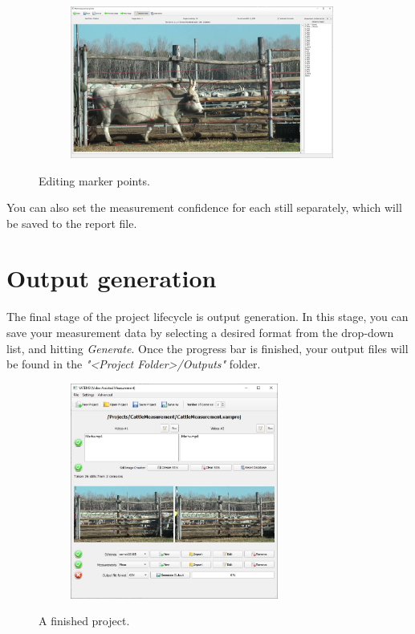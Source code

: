 \documentclass[10pt,a4paper,oneside]{report}             %
\begin{document}
\begin{figure}[H]
	\centering
	\begin{subfigure}{\textwidth}
		\centering 
		\includegraphics[width=0.95\textwidth]{./images/MeasWSel.jpg}
	\end{subfigure}
	\caption[]
	{\small  Editing marker points.}
\end{figure} 

You can also set the measurement confidence for each still separately, which will be saved to the report file.

\section{Output generation}

The final stage of the project lifecycle is output generation. In this stage, you can save your measurement data by selecting a desired format from the drop-down list, and hitting \textit{Generate}. Once the progress bar is finished, your output files will be found in the \textit{"<Project Folder>/Outputs"} folder.


\begin{figure}[H]
	\centering
	\begin{subfigure}{\textwidth}
		\centering 
		\includegraphics[width=0.75\textwidth]{./images/MWFin.jpg}
	\end{subfigure}
	\caption[]
	{\small  A finished project.}
\end{figure} 
\end{document}
